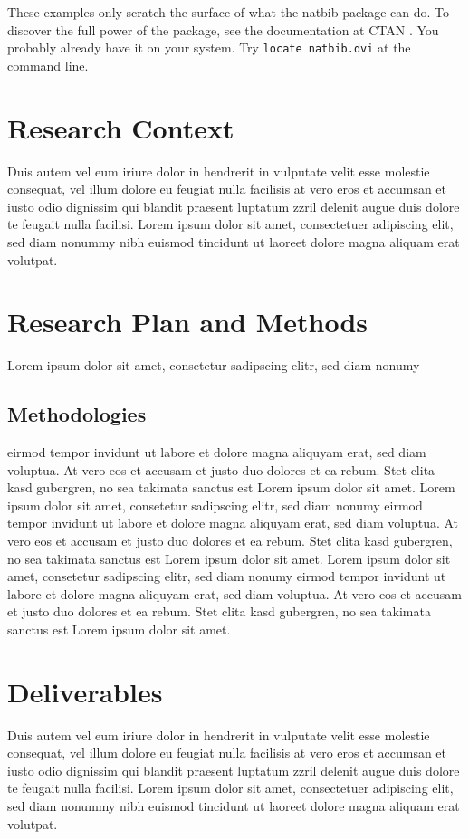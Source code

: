 \documentclass[a4paper,11pt]{article}
\begin{document}
These examples only scratch the surface of what the {\sf natbib} package
can do. To discover the full power of the package, see the documentation at
CTAN \citep{Dal1999}. You probably already have it on your system. Try
\verb+locate natbib.dvi+ at the command line.

\section{Research Context}
Duis autem vel eum iriure dolor in hendrerit in vulputate velit esse molestie
consequat, vel illum dolore eu feugiat nulla facilisis at vero eros et accumsan
et iusto odio dignissim qui blandit praesent luptatum zzril delenit augue duis
dolore te feugait nulla facilisi. Lorem ipsum dolor sit amet, consectetuer
adipiscing elit, sed diam nonummy nibh euismod tincidunt ut laoreet dolore
magna aliquam erat volutpat.

\section{Research Plan and Methods}
Lorem ipsum dolor sit amet, consetetur sadipscing elitr,  sed diam nonumy
\subsection{Methodologies}
eirmod tempor invidunt ut labore et dolore magna aliquyam erat, sed diam
voluptua. At vero eos et accusam et justo duo dolores et ea rebum. Stet clita
kasd gubergren, no sea takimata sanctus est Lorem ipsum dolor sit amet. Lorem
ipsum dolor sit amet, consetetur sadipscing elitr,  sed diam nonumy eirmod
tempor invidunt ut labore et dolore magna aliquyam erat, sed diam voluptua. At
vero eos et accusam et justo duo dolores et ea rebum. Stet clita kasd
gubergren, no sea takimata sanctus est Lorem ipsum dolor sit amet. Lorem ipsum
dolor sit amet, consetetur sadipscing elitr,  sed diam nonumy eirmod tempor
invidunt ut labore et dolore magna aliquyam erat, sed diam voluptua. At vero
eos et accusam et justo duo dolores et ea rebum. Stet clita kasd gubergren, no
sea takimata sanctus est Lorem ipsum dolor sit amet.

\section{Deliverables}
Duis autem vel eum iriure dolor in hendrerit in vulputate velit esse molestie
consequat, vel illum dolore eu feugiat nulla facilisis at vero eros et accumsan
et iusto odio dignissim qui blandit praesent luptatum zzril delenit augue duis
dolore te feugait nulla facilisi. Lorem ipsum dolor sit amet, consectetuer
adipiscing elit, sed diam nonummy nibh euismod tincidunt ut laoreet dolore
magna aliquam erat volutpat.




\end{document}
